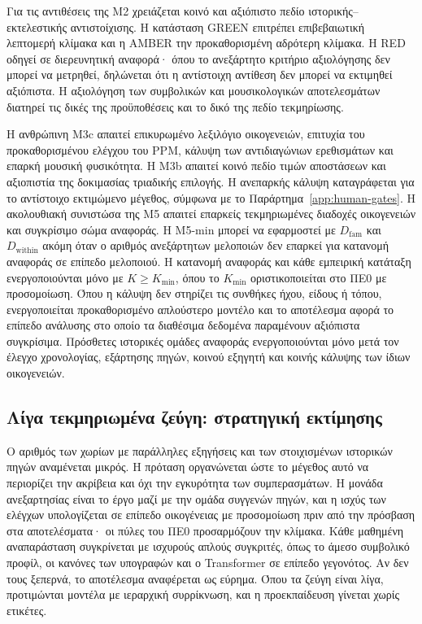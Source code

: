 \documentclass[11pt,a4paper]{article}
\begin{document}
Για τις αντιθέσεις της M2 χρειάζεται κοινό και αξιόπιστο πεδίο ιστορικής--εκτελεστικής αντιστοίχισης. Η κατάσταση GREEN επιτρέπει επιβεβαιωτική λεπτομερή κλίμακα και η AMBER την προκαθορισμένη αδρότερη κλίμακα. Η RED οδηγεί σε διερευνητική αναφορά· όπου το ανεξάρτητο κριτήριο αξιολόγησης δεν μπορεί να μετρηθεί, δηλώνεται ότι η αντίστοιχη αντίθεση δεν μπορεί να εκτιμηθεί αξιόπιστα. Η αξιολόγηση των συμβολικών και μουσικολογικών αποτελεσμάτων διατηρεί τις δικές της προϋποθέσεις και το δικό της πεδίο τεκμηρίωσης.

Η ανθρώπινη M3c απαιτεί επικυρωμένο λεξιλόγιο οικογενειών, επιτυχία του προκαθορισμένου ελέγχου του PPM, κάλυψη των αντιδιαγώνιων ερεθισμάτων και επαρκή μουσική φυσικότητα. Η M3b απαιτεί κοινό πεδίο τιμών αποστάσεων και αξιοπιστία της δοκιμασίας τριαδικής επιλογής. Η ανεπαρκής κάλυψη καταγράφεται για το αντίστοιχο εκτιμώμενο μέγεθος, σύμφωνα με το Παράρτημα~\ref{app:human-gates}. Η ακολουθιακή συνιστώσα της M5 απαιτεί επαρκείς τεκμηριωμένες διαδοχές οικογενειών και συγκρίσιμο σώμα αναφοράς. Η M5-min μπορεί να εφαρμοστεί με $D_{\mathrm{fam}}$ και $D_{\mathrm{within}}$ ακόμη όταν ο αριθμός ανεξάρτητων μελοποιών δεν επαρκεί για κατανομή αναφοράς σε επίπεδο μελοποιού. Η κατανομή αναφοράς και κάθε εμπειρική κατάταξη ενεργοποιούνται μόνο με $K\ge K_{\min}$, όπου το $K_{\min}$ οριστικοποιείται στο ΠΕ0 με προσομοίωση. Όπου η κάλυψη δεν στηρίζει τις συνθήκες ήχου, είδους ή τόπου, ενεργοποιείται προκαθορισμένο απλούστερο μοντέλο και το αποτέλεσμα αφορά το επίπεδο ανάλυσης στο οποίο τα διαθέσιμα δεδομένα παραμένουν αξιόπιστα συγκρίσιμα. Πρόσθετες ιστορικές ομάδες αναφοράς ενεργοποιούνται μόνο μετά τον έλεγχο χρονολογίας, εξάρτησης πηγών, κοινού εξηγητή και κοινής κάλυψης των ίδιων οικογενειών.

\subsection{Λίγα τεκμηριωμένα ζεύγη: στρατηγική εκτίμησης}\label{sec:small-data}

Ο αριθμός των χωρίων με παράλληλες εξηγήσεις και των στοιχισμένων ιστορικών πηγών αναμένεται μικρός. Η πρόταση οργανώνεται ώστε το μέγεθος αυτό να περιορίζει την ακρίβεια και όχι την εγκυρότητα των συμπερασμάτων. Η μονάδα ανεξαρτησίας είναι το έργο μαζί με την ομάδα συγγενών πηγών, και η ισχύς των ελέγχων υπολογίζεται σε επίπεδο οικογένειας με προσομοίωση πριν από την πρόσβαση στα αποτελέσματα· οι πύλες του ΠΕ0 προσαρμόζουν την κλίμακα. Κάθε μαθημένη αναπαράσταση συγκρίνεται με ισχυρούς απλούς συγκριτές, όπως το άμεσο συμβολικό προφίλ, οι κανόνες των υπογραφών και ο Transformer σε επίπεδο γεγονότος. Αν δεν τους ξεπερνά, το αποτέλεσμα αναφέρεται ως εύρημα. Όπου τα ζεύγη είναι λίγα, προτιμώνται μοντέλα με ιεραρχική συρρίκνωση, και η προεκπαίδευση γίνεται χωρίς ετικέτες.
\end{document}
